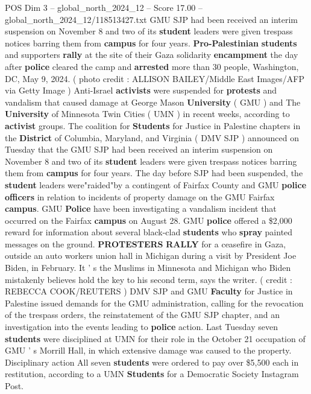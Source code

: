 \begin{textsample}{POS Dim 3 – global\_north\_2024\_12 – Score 17.00 – global\_north\_2024\_12/118513427.txt}  \label{ex:f3_pos_233}
GMU SJP had been received an interim suspension on November 8 and two of its \textbf{student} leaders were given trespass notices barring them from \textbf{campus} for four years. \textbf{Pro-Palestinian} \textbf{students} and supporters \textbf{rally} at the site of their Gaza solidarity \textbf{encampment} the day after \textbf{police} cleared the camp and \textbf{arrested} more than 30 people, Washington, DC, May 9, 2024. ( photo credit : ALLISON BAILEY/Middle East Images/AFP via Getty Image ) Anti-Israel \textbf{activists} were suspended for \textbf{protests} and vandalism that caused damage at George Mason \textbf{University} ( GMU ) and The \textbf{University} of Minnesota Twin Cities ( UMN ) in recent weeks, according to \textbf{activist} groups.
The coalition for \textbf{Students} for Justice in Palestine chapters in the \textbf{District} of Columbia, Maryland, and Virginia ( DMV SJP ) announced on Tuesday that the GMU SJP had been received an interim suspension on November 8 and two of its \textbf{student} leaders were given trespass notices barring them from \textbf{campus} for four years.
The day before SJP had been suspended, the \textbf{student} leaders were"raided"by a contingent of Fairfax County and GMU \textbf{police} \textbf{officers} in relation to incidents of property damage on the GMU Fairfax \textbf{campus}.
GMU \textbf{Police} have been investigating a vandalism incident that occurred on the Fairfax \textbf{campus} on August 28.
GMU \textbf{police} offered a \$2,000 reward for information about several black-clad \textbf{students} who \textbf{spray} painted messages on the ground. \textbf{PROTESTERS} \textbf{RALLY} for a ceasefire in Gaza, outside an auto workers union hall in Michigan during a visit by President Joe Biden, in February.
It ' s the Muslims in Minnesota and Michigan who Biden mistakenly believes hold the key to his second term, says the writer. ( credit : REBECCA COOK/REUTERS ) DMV SJP and GMU \textbf{Faculty} for Justice in Palestine issued demands for the GMU administration, calling for the revocation of the trespass orders, the reinstatement of the GMU SJP chapter, and an investigation into the events leading to \textbf{police} action.
Last Tuesday seven \textbf{students} were disciplined at UMN for their role in the October 21 occupation of GMU ' s Morrill Hall, in which extensive damage was caused to the property.
Disciplinary action All seven \textbf{students} were ordered to pay over \$5,500 each in restitution, according to a UMN \textbf{Students} for a Democratic Society Instagram Post.

\end{textsample}
